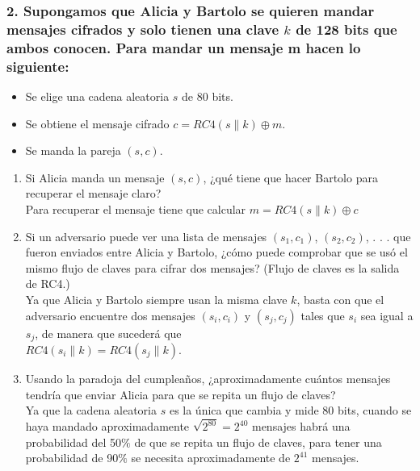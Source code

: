 \documentclass[12pt]{article}
\begin{document}
\subsubsection*{2. Supongamos que Alicia y Bartolo se quieren mandar mensajes cifrados y solo tienen una clave $k$ de 128 bits que ambos conocen. Para mandar un mensaje m hacen lo siguiente:}
\begin{itemize}
\item Se elige una cadena aleatoria $s$ de 80 bits.
\item Se obtiene el mensaje cifrado $c = RC4(s \parallel k) \oplus m$.
\item Se manda la pareja $(s, c)$.
\end{itemize}
\begin{enumerate}[label=\alph*)]
\item Si Alicia manda un mensaje $(s, c)$, ¿qué tiene que hacer Bartolo para recuperar el mensaje claro? \\
Para recuperar el mensaje tiene que calcular $m = RC4(s \parallel k) \oplus c$
  
\item Si un adversario puede ver una lista de mensajes $(s_1, c_1)$, $(s_2, c_2)$, . . . que fueron enviados entre Alicia y Bartolo, ¿cómo puede comprobar que se usó el mismo flujo de claves para cifrar dos mensajes? (Flujo de claves es la salida de RC4.) \\  
  Ya que Alicia y Bartolo siempre usan la misma clave $k$, basta con que el adversario encuentre dos mensajes $(s_i, c_i)$ y $(s_j, c_j)$ tales que $s_i$ sea igual a $s_j$, de manera que sucederá que \\ $RC4(s_i \parallel k) = RC4(s_j \parallel k)$.
  
\item Usando la paradoja del cumpleaños, ¿aproximadamente cuántos mensajes tendría que enviar Alicia para que se repita un flujo de claves? \\
 Ya que la cadena aleatoria $s$ es la única que cambia y mide 80 bits, cuando se haya mandado aproximadamente $\sqrt{2^{80}} = 2^{40}$ mensajes habrá una probabilidad del 50$\%$ de que se repita un flujo de claves, para tener una probabilidad de 90$\%$ se necesita aproximadamente de $2^{41}$ mensajes.
\end{enumerate}
\end{document}
